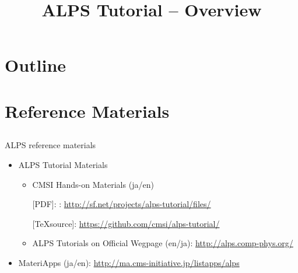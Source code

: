 
\title{ALPS Tutorial -- Overview}




\begin{frame}
  \titlepage
\end{frame}

\section*{Outline}
\begin{frame}[t,fragile]
  \tableofcontents
\end{frame}

\section{Reference Materials}
\subsection*{\redb\whiteb\greenb}

\begin{frame}[t,fragile]{ALPS reference materials}
  \begin{itemize}
    \setlength{\itemsep}{1em}
  \item ALPS Tutorial Materials
    \begin{itemize}
    \item CMSI Hands-on Materials (ja/en)
      
      [PDF]: : {\footnotesize \url{http://sf.net/projects/alps-tutorial/files/}}
      
      [\TeX source]: {\footnotesize \url{https://github.com/cmsi/alps-tutorial/}}
      
    \item ALPS Tutorials on Official Wegpage (en/ja): {\footnotesize \url{http://alps.comp-phys.org/}}
    \end{itemize}
  \item MateriApps (ja/en): {\footnotesize \url{http://ma.cms-initiative.jp/listapps/alps}}
  \end{itemize}
\end{frame}

